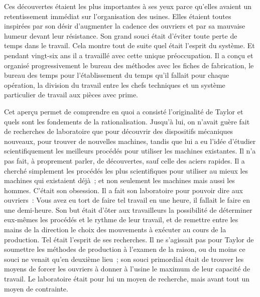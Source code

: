 \documentclass[french,twoside]{book} %
\begin{document}
Ces découvertes étaient les plus importantes à ses yeux parce qu'elles avaient un retentissement immédiat sur l'organisation des usines. Elles étaient toutes inspirées par son désir d'augmenter la cadence des ouvriers et par sa mauvaise humeur devant leur résistance. Son grand souci était d'éviter toute perte de temps dans le travail. Cela montre tout de suite quel était l’esprit du système. Et pendant vingt-six ans il a travaillé avec cette unique préoccupation. Il a conçu et organisé progressivement le bureau des méthodes avec les fiches de fabrication, le bureau des temps pour l'établissement du temps qu'il fallait pour chaque opération, la division du travail entre les chefs techniques et un système particulier de travail aux pièces avec prime.\par
Cet aperçu permet de comprendre en quoi a consisté l’originalité de Taylor et quels sont les fondements de la rationalisation. Jusqu'à lui, on n'avait guère fait de recherches de laboratoire que pour découvrir des dispositifs mécaniques nouveaux, pour trouver de nouvelles machines, tandis que lui a eu l’idée d’étudier scientifiquement les meilleurs procédés pour utiliser les machines existantes. Il n’a pas fait, à proprement parler, de découvertes, sauf celle des aciers rapides. Il a cherché simplement les procédés les plus scientifiques pour utiliser au mieux les machines qui existaient déjà ; et non seulement les machines mais aussi les hommes. C'était son obsession. Il a fait son laboratoire pour pouvoir dire aux ouvriers : Vous avez eu tort de faire tel travail en une heure, il fallait le faire en une demi-heure. Son but était d'ôter aux travailleurs la possibilité de déterminer eux-mêmes les procédés et le rythme de leur travail, et de remettre entre les mains de la direction le choix des mouvements à exécuter au cours de la production. Tel était l'esprit de ses recherches. Il ne s'agissait pas pour Taylor de soumettre les méthodes de production à l'examen de la raison, ou du moins ce souci ne venait qu'en deuxième lieu ; son souci primordial était de trouver les moyens de forcer les ouvriers à donner à l'usine le maximum de leur capacité de travail. Le laboratoire était pour lui un moyen de recherche, mais avant tout un moyen de contrainte.\par
\end{document}
